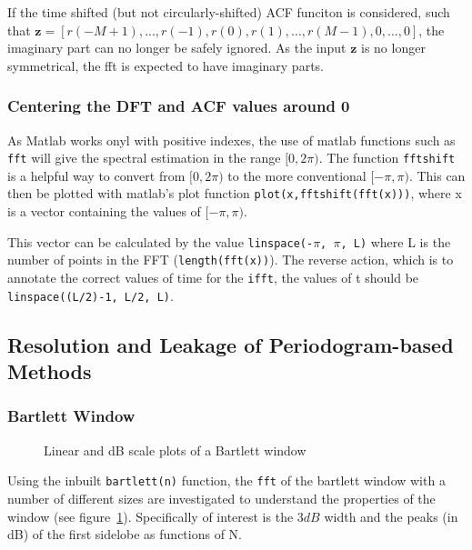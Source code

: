 \documentclass[main.tex]{subfiles}
\begin{document}
If the time shifted (but not circularly-shifted) ACF funciton is considered, such that $\textbf{z}=[r(-M+1),...,r(-1),r(0),r(1),...,r(M-1),0,...,0]$, the imaginary part can no longer be safely ignored. As the input $\textbf{z}$ is no longer 
symmetrical, the fft is expected to have imaginary parts.

\subsubsection{Centering the DFT and ACF values around 0}

As Matlab works onyl with positive indexes, the use of matlab functions such as {\tt fft} will give the spectral estimation in the range $[0,2\pi)$. The function {\tt fftshift} is a helpful way to convert from $[0,2\pi)$ to the more conventional $[-\pi,\pi)$. This can then be plotted with matlab's plot function {\tt plot(x,fftshift(fft(x)))}, where x is a vector containing the values of $[-\pi,\pi)$.

This vector can be calculated by the value {\tt linspace(-$\pi$, $\pi$, L)} where L is the number of points in the FFT ({\tt length(fft(x))}). The reverse action, which is to annotate the correct values of time for the {\tt ifft}, the values of t should be {\tt linspace((L/2)-1, L/2, L)}. %




















\subsection{Resolution and Leakage of Periodogram-based Methods}


\subsubsection{Bartlett Window}

\begin{figure}[H]
	\centering 
	\resizebox{\textwidth}{!}{}
	\caption{Linear and dB scale plots of a Bartlett window}
	\label{fig:q1_3_a}
\end{figure}

Using the inbuilt {\tt bartlett(n)} function, the {\tt fft} of the bartlett window with a number of different sizes are investigated to understand the properties of the window (see figure~\ref{fig:q1_3_a}). Specifically of interest is the $3dB$ width and the peaks (in dB) of the first sidelobe as functions of N.  
\end{document}
